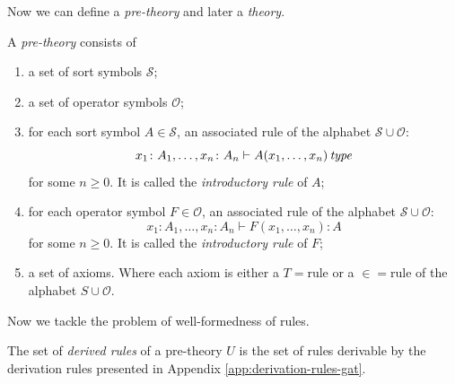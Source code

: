 Now we can define a \textit{pre-theory} and later a \textit{theory}.

\begin{definition}
    A \textit{pre-theory} consists of
    \begin{enumerate}
        \item a set of sort symbols $\mathcal{S}$;
        \item a set of operator symbols $\mathcal{O}$;
        \item for each sort symbol $A \in \mathcal{S}$, an associated rule 
              of the alphabet $\mathcal{S} \cup \mathcal{O}$:
              \begin{equation*}
                x_1 \colon A_1, \dots, x_n \colon A_n \vdash A(x_1, \dots, x_n) \operatorname{\mathit{\space type}}
              \end{equation*}
              for some $n \geq 0$. It is called the \textit{introductory
              rule} of $A$;
        \item for each operator symbol $F \in \mathcal{O}$, an associated rule
              of the alphabet $\mathcal{S} \cup \mathcal{O}$:
              \begin{equation*}
                x_1 \colon A_1, \dots, x_n \colon A_n \vdash F(x_1, \dots, x_n) \colon A
              \end{equation*}
              for some $n \geq 0$. It is called the \textit{introductory
              rule} of $F$;
        \item a set of axioms. Where each axiom is either a $T{=}$rule or
              a $\in=$rule of the alphabet $S \cup \mathcal{O}$.

    \end{enumerate}
\end{definition}

Now we tackle the problem of well-formedness of rules.

\begin{definition}
    The set of \textit{derived rules} of a pre-theory $U$ is the
    set of rules derivable by the derivation rules presented in Appendix \ref{app:derivation-rules-gat}.
\end{definition}

